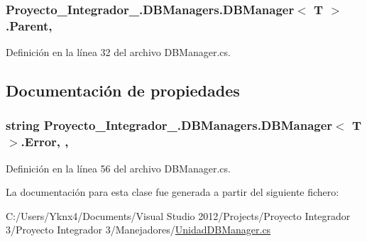 \hypertarget{class_proyecto___integrador__3_1_1_d_b_managers_1_1_d_b_manager_3_01_t_01_4_a06315e75298c8f2fd46f32dc7c9a80b2}{
\subsubsection[{Parent}]{ Proyecto\-\_\-\-Integrador\-\_.\-D\-B\-Managers.\-D\-B\-Manager$<$ T $>$.Parent\hspace{0.3cm}{\ttfamily [protected]}, {\ttfamily [inherited]}}}\label{class_proyecto___integrador__3_1_1_d_b_managers_1_1_d_b_manager_3_01_t_01_4_a06315e75298c8f2fd46f32dc7c9a80b2}


Definición en la línea 32 del archivo D\-B\-Manager.\-cs.



\subsection{Documentación de propiedades}
\hypertarget{class_proyecto___integrador__3_1_1_d_b_managers_1_1_d_b_manager_3_01_t_01_4_a6e5caaed2ee1a4d067dfbf5aaa1b1fa8}{
\subsubsection[{Error}]{\setlength{\rightskip}{0pt plus 5cm}string Proyecto\-\_\-\-Integrador\-\_.\-D\-B\-Managers.\-D\-B\-Manager$<$ T $>$.Error\hspace{0.3cm}{\ttfamily [get]}, {\ttfamily [set]}, {\ttfamily [inherited]}}}\label{class_proyecto___integrador__3_1_1_d_b_managers_1_1_d_b_manager_3_01_t_01_4_a6e5caaed2ee1a4d067dfbf5aaa1b1fa8}


Definición en la línea 56 del archivo D\-B\-Manager.\-cs.



La documentación para esta clase fue generada a partir del siguiente fichero\-:\begin{DoxyCompactItemize}
\item 
C\-:/\-Users/\-Yknx4/\-Documents/\-Visual Studio 2012/\-Projects/\-Proyecto Integrador 3/\-Proyecto Integrador 3/\-Manejadores/\hyperlink{_unidad_d_b_manager_8cs}{Unidad\-D\-B\-Manager.\-cs}\end{DoxyCompactItemize}
